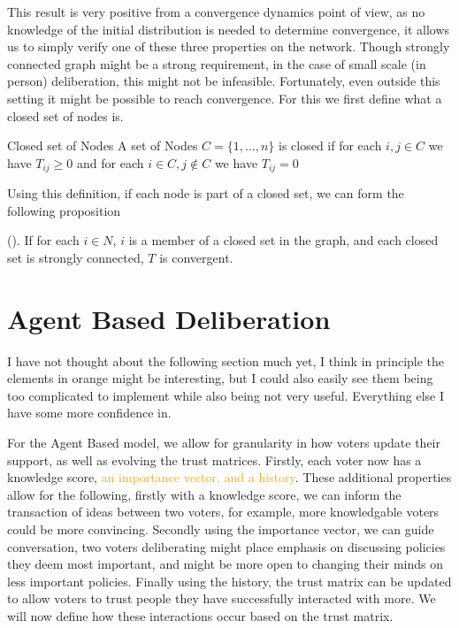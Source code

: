 This result is very positive from a convergence dynamics point of view, as no knowledge of the initial distribution is needed to determine convergence, it allows us to simply verify one of these three properties on the network. Though strongly connected graph might be a strong requirement, in the case of small scale (in person) deliberation, this might not be infeasible. Fortunately, even outside this setting it might be possible to reach convergence. For this we first define what a closed set of nodes is.

\begin{definition}{Closed set of Nodes}{}
	A set of Nodes \(C = \{1, \dots, n\}\) is closed if for each \(i,j \in C\) we have $T_{ij} \geq 0$ and for each \(i \in C, j \notin C\) we have \(T_{ij} = 0\)
\end{definition}

Using this definition, if each node is part of a closed set, we can form the following proposition

\begin{proposition}{(\citet{golubNaiveLearningSocial2010}).}
	If for each \(i \in N\), \(i\) is a member of a closed set in the graph, and each closed set is strongly connected, \(T\) is convergent.
\end{proposition}

\section{Agent Based Deliberation}
\textcolor{RedViolet}{I have not thought about the following section much yet, I think in principle the elements in orange might be interesting, but I could also easily see them being too complicated to implement while also being not very useful. Everything else I have some more confidence in.}

For the Agent Based model, we allow for granularity in how voters update their support, as well as evolving the trust matrices. Firstly, each voter now has a knowledge score, \textcolor{orange}{an importance vector, and a history}. These additional properties allow for the following, firstly with a knowledge score, we can inform the transaction of ideas between two voters, for example, more knowledgable voters could be more convincing. Secondly using the importance vector, we can guide conversation, two voters deliberating might place emphasis on discussing policies they deem most important, and might be more open to changing their minds on less important policies. Finally using the history, the trust matrix can be updated to allow voters to trust people they have successfully interacted with more. We will now define how these interactions occur based on the trust matrix.


